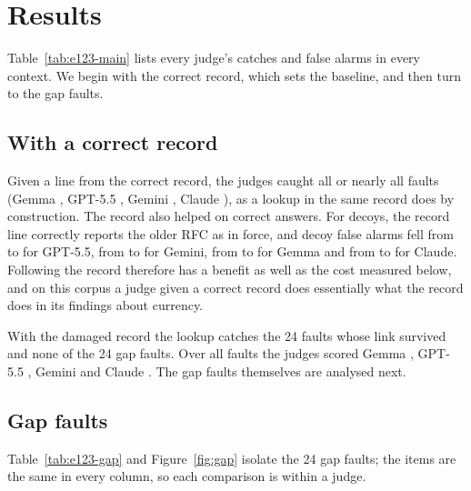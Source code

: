 \section{Results}
\label{sec:results}

Table~\ref{tab:e123-main} lists every judge's catches and false alarms in every context. We begin with the correct
record, which sets the baseline, and then turn to the gap faults.


\subsection{With a correct record}
\label{sec:res-correct}

Given a line from the correct record, the judges caught all or nearly all faults (Gemma \EGemmaCatchRecord, GPT-5.5
\EGPTCatchRecord, Gemini \EGeminiCatchRecord, Claude \EOpusCatchRecord), as a lookup in the same record does by
construction. The record also helped on correct answers. For decoys, the record line correctly reports the older RFC as
in force, and decoy false alarms fell from \EGPTDecoyFATexts{} to \EGPTDecoyFARecord{} for GPT-5.5, from
\EGeminiDecoyFATexts{} to \EGeminiDecoyFARecord{} for Gemini, from \EGemmaDecoyFATexts{} to \EGemmaDecoyFARecord{} for Gemma and from \EOpusDecoyFATexts{} to \EOpusDecoyFARecord{} for
Claude. Following the record therefore has a benefit as well as the cost measured below, and on this corpus a judge
given a correct record does essentially what the record does in its findings about currency.

With the damaged record the lookup catches the 24 faults whose link survived and none of the 24 gap faults. Over all
\ENLinks{} faults the judges scored Gemma \EGemmaCatchDamaged, GPT-5.5 \EGPTCatchDamaged, Gemini \EGeminiCatchDamaged{}
and Claude \EOpusCatchDamaged. The gap faults themselves are analysed next.

\subsection{Gap faults}
\label{sec:res-gaps}

Table~\ref{tab:e123-gap} and Figure~\ref{fig:gap} isolate the 24 gap faults; the items are the same in every column, so each comparison is
within a judge.

